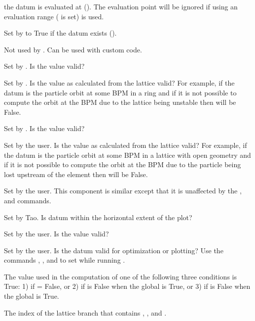 \begin{description}
{the datum is evaluated at (). The evaluation point will be ignored if using an
evaluation range ( is set) is used.
%
  \item[exists] \Newline
Set by \tao to True if the datum exists (). 
%
  \item[fit] \Newline
Not used by \tao. Can be used with custom code.
%
  \item[good_base] \Newline
Set by \tao. Is the  value valid?
%
  \item[good_design] \Newline
Set by \tao. Is the value as calculated from the  lattice valid? For example, if the
datum is the particle orbit at some BPM in a ring and if it is not possible to compute the orbit at
the BPM due to the lattice being unstable then  will be False.
%
  \item[good_meas] \Newline
Set by \tao. Is the  value valid?
%
  \item[good_model] \Newline
Set by the user. Is the value as calculated from the  lattice valid? For example, if the
datum is the particle orbit at some BPM in a lattice with open geometry and if it is not possible to
compute the orbit at the BPM due to the particle being lost upstream of the element then
 will be False.
%
  \item[good_opt] \Newline
Set by the user. This component is similar  except that it is unaffected by the
,  and  commands.
%
  \item[good_plot] \Newline
Set by Tao. Is datum within the horizontal extent of the plot? 
%
  \item[good_ref] \Newline
Set by the user. Is the  value valid?
%
  \item[good_user] \Newline
Set by the user. Is the datum valid for optimization or plotting? Use the commands , ,
 and  to set while running \tao.
%
  \item[invalid] \Newline
The value used in the computation of  one of the following three conditions is
True: 1) if  = False, or 2) if  is False when the global 
is True, or 3) if  is False when the global  is True.
%
  \item[ix_branch] \Newline
The index of the lattice branch that contains , , and .
%
  \item[ix_ele] \Newline
}
\end{description}
